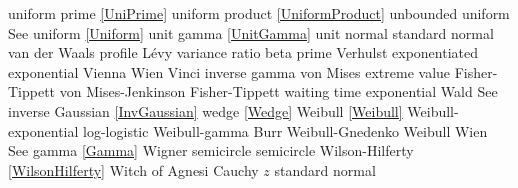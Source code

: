 uniform prime					\dotfill	\eqref{UniPrime}					\ncite	%
uniform product 				\dotfill	\eqref{UniformProduct}				\ncite 	%
%
unbounded uniform 				\dotfill	See uniform \eqref{Uniform}			\ncite	%
unit gamma					\dotfill	\eqref{UnitGamma} 					\ncite	%
unit normal					\dotfill	standard normal 					\ncite	%
%
van der Waals profile 			\dotfill	L\'{e}vy 							\ncite	%
variance ratio					\dotfill	beta prime 						\ncite	%
Verhulst						\dotfill	exponentiated exponential					 
Vienna 						\dotfill	Wien 							\ncite	%
Vinci 						\dotfill	inverse gamma 					\ncite	%
von Mises extreme value			\dotfill	Fisher-Tippett 						\ncite	%
von Mises-Jenkinson 			\dotfill	Fisher-Tippett 						\ncite	%
%
waiting time					\dotfill	exponential 						\ncite	%
Wald							\dotfill	See inverse Gaussian	 \eqref{InvGaussian}				\ncite	%
wedge						\dotfill	\eqref{Wedge}  						\ncite	%
Weibull 						\dotfill	\eqref{Weibull} 						\ncite	%
Weibull-exponential 				\dotfill	log-logistic 						\ncite	%
Weibull-gamma					\dotfill	Burr								\ncite	%
Weibull-Gnedenko				\dotfill	Weibull 							\ncite	%
Wien							\dotfill	See gamma \eqref{Gamma}			\ncite	%
Wigner semicircle				\dotfill	semicircle 						\ncite	%
Wilson-Hilferty					\dotfill	\eqref{WilsonHilferty} 				\ncite	%
Witch of Agnesi					\dotfill	Cauchy								%
%	
$z$							\dotfill	standard normal 					\ncite	%



\clearpage

